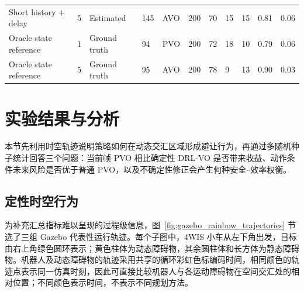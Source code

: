 \documentclass[UTF8,10pt,a4paper,twocolumn]{ctexart}
\begin{document}
\begin{table}[!t]
{\begin{tabular}{p{}p{}p{}p{}p{}p{}p{}p{}p{}p{}p{}}
        Short history + delay & 5 & Estimated & 145 & AVO & 200 & 70 & 15 & 15 & 0.81 & 0.06 \\
        Oracle state reference & 1 & Ground truth & 94 & PVO & 200 & 72 & 18 & 10 & 0.79 & 0.06 \\
        Oracle state reference & 5 & Ground truth & 95 & AVO & 200 & 78 & 9 & 13 & 0.90 & 0.03 \\
        \bottomrule
    \end{tabular}}
\end{table}

\section{实验结果与分析}

本节先利用时空轨迹说明策略如何在动态交汇区域形成避让行为，再通过多随机种子统计回答三个问题：当前帧 PVO 相比确定性 DRL-VO 是否带来收益、动作条件未来风险是否优于普通 PVO，以及不确定性修正会产生何种安全--效率权衡。

\subsection{定性时空行为}

为补充汇总指标难以呈现的过程级信息，图~\ref{fig:gazebo_rainbow_trajectories} 节选了三组 Gazebo 代表性运行轨迹。每个子图中，4WIS 小车从左下角出发，目标由右上角绿色圆环表示；黄色柱体为动态障碍物，其余圆柱体和长方体为静态障碍物。机器人及动态障碍物的轨迹采用共享的循环彩虹色标编码时间，相同颜色的轨迹点表示同一仿真时刻，因此可直接比较机器人与各运动障碍物在空间交汇处的相对位置；不同颜色表示时间，不表示不同规划方法。
\end{document}

